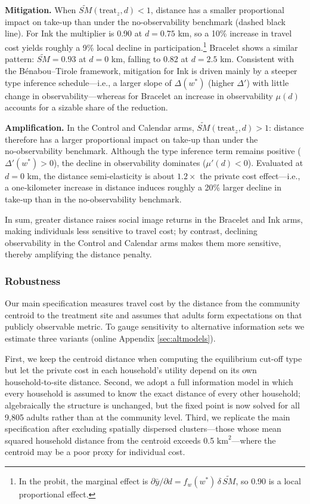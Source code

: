 \documentclass[12pt,a4paper]{article}
\begin{document}
\textbf{Mitigation.}
When $\tilde{SM}(\text{treat}_{z},d)<1$, distance has a smaller proportional impact on take-up than under the no-observability benchmark (dashed black line).
For Ink the multiplier is 0.90 at $d=0.75$ km, so a 10\% increase in travel cost yields roughly a 9\% local decline in participation.\footnote{In the probit, the marginal effect is $\partial \bar y / \partial d = f_w(w^\ast)\,\delta\,\tilde{SM}$, so 0.90 is a local proportional effect.}
Bracelet shows a similar pattern: $\tilde{SM}=0.93$ at $d=0$ km, falling to 0.82 at $d=2.5$ km.
Consistent with the Bénabou–Tirole framework, mitigation for Ink is driven mainly by a steeper type inference schedule—i.e., a larger slope of $\Delta(w^\ast)$ (higher $\Delta'$) with little change in observability—whereas for Bracelet an increase in observability $\mu(d)$ accounts for a sizable share of the reduction.


\textbf{Amplification.}
In the Control and Calendar arms, $\tilde{SM}(\mathrm{treat}_z,d)>1$: distance therefore has a larger proportional impact on take‑up than under the no‑observability benchmark. Although the type inference term remains positive ($\Delta'(w^{\ast})>0$), the decline in observability dominates ($\mu'(d)<0$). Evaluated at $d=0$ km, the distance semi‑elasticity is about $1.2\times$ the private cost effect—i.e., a one‑kilometer increase in distance induces roughly a 20\% larger decline in take‑up than in the no-observability benchmark.

In sum, greater distance raises social image returns in the Bracelet and Ink arms, making individuals less sensitive to travel cost; by contrast, declining observability in the Control and Calendar arms makes them more sensitive, thereby amplifying the distance penalty.

\subsubsection{Robustness}

Our main specification measures travel cost by the distance from the community centroid to the treatment site and assumes that adults form expectations on that publicly observable metric. To gauge sensitivity to alternative information sets we estimate three variants (online Appendix \ref{sec:altmodels}).

First, we keep the centroid distance when computing the equilibrium cut-off type but let the private cost in each household’s utility depend on its own household‑to‑site distance.  Second, we adopt a full information model in which every household is assumed to know the exact distance of every other household; algebraically the structure is unchanged, but the fixed point is now solved for all 9,805 adults rather than at the community level.  Third, we replicate the main specification after excluding spatially dispersed clusters—those whose mean squared household distance from the centroid exceeds 0.5$\text{ km}^{2}$—where the centroid may be a poor proxy for individual cost.
\end{document}
